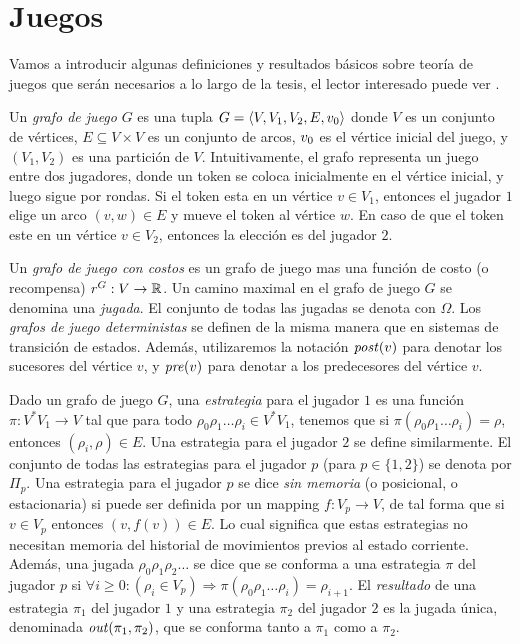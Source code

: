 \section{Juegos}
Vamos a introducir algunas definiciones y resultados básicos sobre teoría de juegos que serán necesarios a lo largo de la tesis, el lector interesado puede ver \cite{AptG11}.

Un \emph{grafo de juego} $G$ es una tupla $G = \langle V, V_1, V_2, E, v_0 \rangle$ donde $V$ es un conjunto de vértices, $E\subseteq V \times V$ es un conjunto de arcos, $v_0$ es el vértice inicial del juego, y $(V_1, V_2)$ es una partición de $V$. Intuitivamente, el grafo representa un juego entre dos jugadores, donde un token se coloca inicialmente en el vértice inicial, y luego sigue por rondas. Si el token esta en un vértice $v \in V_1$, entonces el jugador $1$ elige un arco $(v, w) \in E$ y mueve el token al vértice $w$. En caso de que el token este en un vértice $v \in V_2$, entonces la elección es del jugador $2$.

Un \emph{grafo de juego con costos} es un grafo de juego mas una función de costo (o recompensa) $\mathit{r}^G:V \rightarrow \mathbb{R}$. Un camino maximal en el grafo de juego $G$ se denomina una \emph{jugada}. El conjunto de todas las jugadas se denota con $\Omega$. Los \emph{grafos de juego deterministas} se definen de la misma manera que en sistemas de transición de estados. Además, utilizaremos la notación $\mathit{post}(v)$ para denotar los sucesores del vértice $v$, y $\mathit{pre}(v)$ para denotar a los predecesores del vértice $v$.

Dado un grafo de juego $G$, una \emph{estrategia} para el jugador $1$ es una función $\pi: V^{*} V_1 \rightarrow V$ tal que para todo  $\rho_0  \rho_1 \dots \rho_i \in V^{*} V_1$, tenemos que si $\pi(\rho_0  \rho_1\dots \rho_i) = \rho $, entonces $(\rho_i, \rho) \in E$. Una estrategia para el jugador $2$ se define similarmente. El conjunto de todas las estrategias para el jugador $p$ (para $p \in \{1,2\}$) se denota por $\Pi_{p}$.
Una estrategia para el jugador $p$ se dice \emph{sin memoria} (o posicional, o estacionaria) si puede ser definida por un mapping $f:V_p \rightarrow V$, de tal forma que si $v \in V_p$ entonces $(v, f(v)) \in E$.
Lo cual significa que estas estrategias no necesitan memoria del historial de movimientos previos al estado corriente. Además, una jugada $\rho_0 \rho_1 \rho_2 \dots$ se dice que se conforma a una estrategia $\pi$ del jugador $p$ si $\forall i \geq 0: (\rho_i \in V_p) \Rightarrow  \pi(\rho_0 \rho_1 \dots \rho_i) = \rho_{i+1}$. El \emph{resultado} de una estrategia $\pi_{1}$ del jugador $1$ y una estrategia $\pi_{2}$ del jugador $2$ es la jugada única, denominada $\mathit{out}(\pi_1, \pi_2)$, que se conforma tanto a $\pi_1$ como a $\pi_2$.

